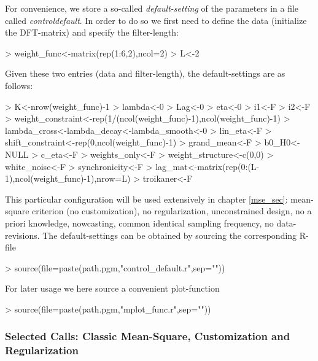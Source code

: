 \documentclass[a4paper]{book}
\begin{document}
For convenience, we store a so-called \emph{default-setting} of the parameters in a file called \emph{control\textunderscore default}. In order to do so we first need to define the data (initialize the DFT-matrix) and specify the filter-length:
\begin{Schunk}
\begin{Sinput}
> weight_func<-matrix(rep(1:6,2),ncol=2)
> L<-2
\end{Sinput}
\end{Schunk}
Given these two entries (data and filter-length), the default-settings are as follows:
\begin{Schunk}
\begin{Sinput}
> K<-nrow(weight_func)-1
> lambda<-0
> Lag<-0
> eta<-0
> i1<-F
> i2<-F
> weight_constraint<-rep(1/(ncol(weight_func)-1),ncol(weight_func)-1)
> lambda_cross<-lambda_decay<-lambda_smooth<-0
> lin_eta<-F
> shift_constraint<-rep(0,ncol(weight_func)-1)
> grand_mean<-F
> b0_H0<-NULL
> c_eta<-F
> weights_only<-F
> weight_structure<-c(0,0)
> white_noise<-F
> synchronicity<-F
> lag_mat<-matrix(rep(0:(L-1),ncol(weight_func)-1),nrow=L)
> troikaner<-F
\end{Sinput}
\end{Schunk}
This particular configuration will be used extensively in chapter \ref{mse_sec}: mean-square criterion (no customization), no regularization, unconstrained design, no a priori knowledge, nowcasting, common identical sampling frequency, no data-revisions. The default-settings can be obtained by sourcing the corresponding R-file

\begin{Schunk}
\begin{Sinput}
> source(file=paste(path.pgm,"control_default.r",sep=""))
\end{Sinput}
\end{Schunk}
For later usage we here source a convenient plot-function
\begin{Schunk}
\begin{Sinput}
> source(file=paste(path.pgm,"mplot_func.r",sep=""))
\end{Sinput}
\end{Schunk}

\subsubsection{Selected Calls: Classic Mean-Square, Customization and Regularization}
\end{document}
